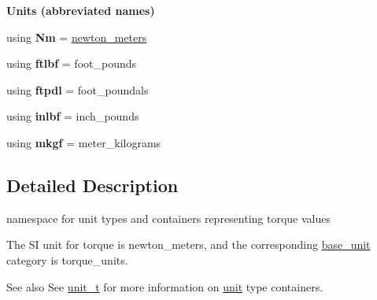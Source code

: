 \begin{Indent}{\bf Units (abbreviated names)}\par
\begin{DoxyCompactItemize}
\item 
\hypertarget{namespaceunits_1_1torque_ab6dfb971be305f30ef3160115d1d0bfb}{}using {\bfseries Nm} = \hyperlink{structunits_1_1unit}{newton\+\_\+meters}\label{namespaceunits_1_1torque_ab6dfb971be305f30ef3160115d1d0bfb}

\item 
\hypertarget{namespaceunits_1_1torque_a3b68bce1bbf87796917e67a13aa14b78}{}using {\bfseries ftlbf} = foot\+\_\+pounds\label{namespaceunits_1_1torque_a3b68bce1bbf87796917e67a13aa14b78}

\item 
\hypertarget{namespaceunits_1_1torque_a93b847f8a109f9803e1ef6559abd7009}{}using {\bfseries ftpdl} = foot\+\_\+poundals\label{namespaceunits_1_1torque_a93b847f8a109f9803e1ef6559abd7009}

\item 
\hypertarget{namespaceunits_1_1torque_a905b65e278904e7db0c0d76829c2cc4a}{}using {\bfseries inlbf} = inch\+\_\+pounds\label{namespaceunits_1_1torque_a905b65e278904e7db0c0d76829c2cc4a}

\item 
\hypertarget{namespaceunits_1_1torque_a5f2a25422aeecaa0134755404482cffb}{}using {\bfseries mkgf} = meter\+\_\+kilograms\label{namespaceunits_1_1torque_a5f2a25422aeecaa0134755404482cffb}

\end{DoxyCompactItemize}
\end{Indent}


\subsection{Detailed Description}
namespace for unit types and containers representing torque values 

The S\+I unit for torque is {\ttfamily newton\+\_\+meters}, and the corresponding {\ttfamily \hyperlink{structunits_1_1base__unit}{base\+\_\+unit}} category is {\ttfamily torque\+\_\+units}. \begin{DoxySeeAlso}{See also}
See \hyperlink{classunits_1_1unit__t}{unit\+\_\+t} for more information on \hyperlink{structunits_1_1unit}{unit} type containers. 
\end{DoxySeeAlso}
